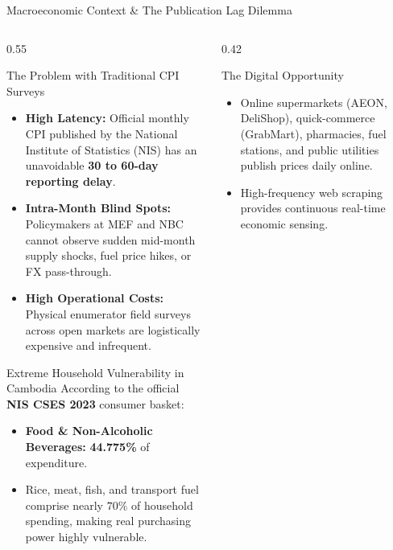 \documentclass[aspectratio=169, 10pt]{beamer}
\begin{document}
\begin{frame}[shrink=10]{Macroeconomic Context \& The Publication Lag Dilemma}
  \begin{columns}
    \begin{column}{0.55\textwidth}
      \begin{block}{The Problem with Traditional CPI Surveys}
        \begin{itemize}
          \item \textbf{High Latency:} Official monthly CPI published by the National Institute of Statistics (NIS) has an unavoidable \textbf{30 to 60-day reporting delay}.
          \item \textbf{Intra-Month Blind Spots:} Policymakers at MEF and NBC cannot observe sudden mid-month supply shocks, fuel price hikes, or FX pass-through.
          \item \textbf{High Operational Costs:} Physical enumerator field surveys across open markets are logistically expensive and infrequent.
        \end{itemize}
      \end{block}

      \begin{alertblock}{Extreme Household Vulnerability in Cambodia}
        According to the official \textbf{NIS CSES 2023} consumer basket:
        \begin{itemize}
          \item \textbf{Food \& Non-Alcoholic Beverages:} \textbf{44.775\%} of expenditure.
          \item Rice, meat, fish, and transport fuel comprise nearly $70\%$ of household spending, making real purchasing power highly vulnerable.
        \end{itemize}
      \end{alertblock}
    \end{column}

    \begin{column}{0.42\textwidth}
      \begin{exampleblock}{The Digital Opportunity}
        \begin{itemize}
          \item Online supermarkets (AEON, DeliShop), quick-commerce (GrabMart), pharmacies, fuel stations, and public utilities publish prices daily online.
          \item High-frequency web scraping provides continuous real-time economic sensing.
        \end{itemize}
      \end{exampleblock}


\end{column}
\end{columns}
\end{frame}
\end{document}
